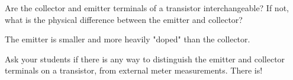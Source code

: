 

Are the collector and emitter terminals of a transistor interchangeable?  If not, what is the physical difference between the emitter and collector?







The emitter is smaller and more heavily "doped" than the collector.







Ask your students if there is any way to distinguish the emitter and collector terminals on a transistor, from external meter measurements.  There is!




